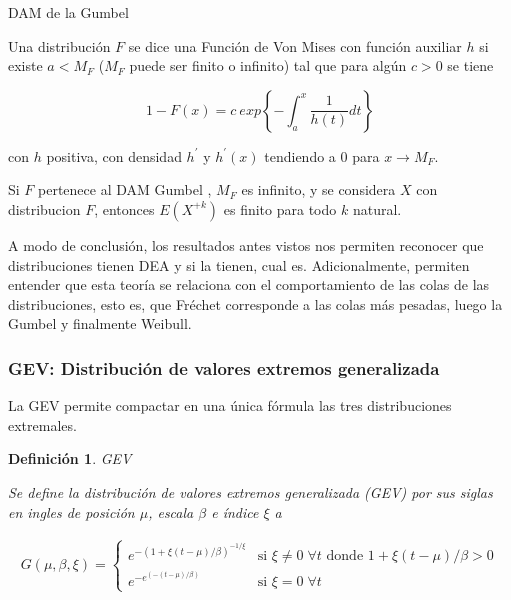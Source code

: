 \documentclass[
  12pt]{article}
\newtheorem{definition}{Definición}[section]
\begin{document}
\begin{theorem} DAM de la Gumbel

Una distribución $F$ se dice una Función de Von Mises con función auxiliar $h$ si existe $a < M_F$ ($M_F$ puede ser finito o infinito) tal que para algún $c>0$ se tiene

$$
1-F(x)=c\:exp\left \{  - \int_a^x \frac{1}{h(t)} dt \right \}
$$

con $h$ positiva, con densidad $h^{\prime}$ y $h^{\prime}(x)$ tendiendo a $0$ para $x \rightarrow M_F$.
\end{theorem}

\begin{Corolario}
Si $F$ pertenece al DAM Gumbel , $M_F$ es infinito, y se considera $X$ con distribucion $F$, entonces $E(X^{+k})$ es finito para todo $k$ natural.
\end{Corolario}

A modo de conclusión, los resultados antes vistos nos permiten reconocer
que distribuciones tienen DEA y si la tienen, cual es. Adicionalmente,
permiten entender que esta teoría se relaciona con el comportamiento de
las colas de las distribuciones, esto es, que Fréchet corresponde a las
colas más pesadas, luego la Gumbel y finalmente Weibull.

\newpage

\subsubsection*{GEV: Distribución de valores extremos generalizada}

La GEV permite compactar en una única fórmula las tres distribuciones
extremales.

\begin{definition} GEV

Se define la distribución de valores extremos generalizada (GEV) por sus siglas en ingles de posición $\mu$, escala $\beta$ e índice $\xi$ a

\begin{align*}
G(\mu, \beta, \xi) = \begin{cases}
e^{ -\left ( 1+\xi(t-\mu)/\beta \right )^{-1/\xi} } & \text{si } \xi\neq 0\; \forall t \text{ donde } 1+\xi(t-\mu)/\beta>0\\ 
e^{ -e^{\left ( -(t-\mu)/\beta \right )}} & \text{si } \xi=0 \; \forall t
\end{cases}
\end{align*}
\end{definition}
\end{document}
